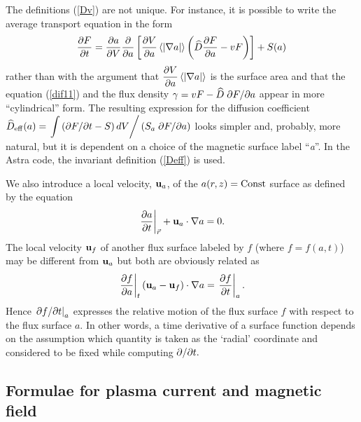 The definitions (\ref{Dv}) are not unique. 
For instance, it is possible to write the average transport equation in
the form 
\begin{equation}\label{dif11}
\prti{F}{t}
=\prti{a}{V}\prti{}{a}\lb[\prti{V}{a}\av{|\na a|}
\lb(\widehat D\prti{F}{a} - v F\rb)
\rb]+S(a)
\end{equation}
rather than  with the argument that $\prti{V}{a}\av{|\na a|}$ is 
the surface area and that the equation (\ref{dif11}) 
and the flux density $\gamma=vF-\widehat D\;\partial{F}/\partial{a}$ appear in
more ``cylindrical'' form. 
The resulting expression for the diffusion coefficient
$
\widehat D_{\rm eff}(a)
=\left.\displaystyle\int\left(\partial{F}/\partial{t}-S\right)dV\right/\left(S_a\;
\partial{F}/\partial{a}\right)  
$
looks simpler and, probably, more natural, but it is dependent on 
a choice of the magnetic surface label ``{\it a}''. 
In the Astra code, the invariant definition (\ref{Deff}) is used.

We also introduce a local velocity, ${\bf u}_a$, of the $a(r,z)={\rm Const}$ surface as defined by the equation
\begin{equation}
\label{u}
\left.\displaystyle{\partial a\over\partial t}\right|_{\vec r} 
+{\bf u}_a\cdot\nabla a = 0
.\end{equation}
The local velocity ${\bf u}_f$ of another flux surface labeled by $f$
(where $f=f(a,t)$) may be different from ${\bf u}_a$ but both are
obviously related as 
\begin{equation}\label{urel}
\left.\displaystyle{\partial f\over\partial a}\right|_t
\left({\bf u}_a-{\bf u}_f\right)\cdot\nabla a
= \left.\displaystyle{\partial f\over\partial t}\right|_a 
.\end{equation}
Hence $\left.\partial{f}/\partial{t}\right|_a$ expresses the relative motion of
the flux surface $f$ with respect to the flux surface $a.$ 
In other words, a time derivative of a surface function depends on the
assumption which quantity is taken as the `radial' coordinate and
considered to be fixed while computing $\partial/\partial t.$ 

\subsection{Formulae for plasma current and magnetic field}

